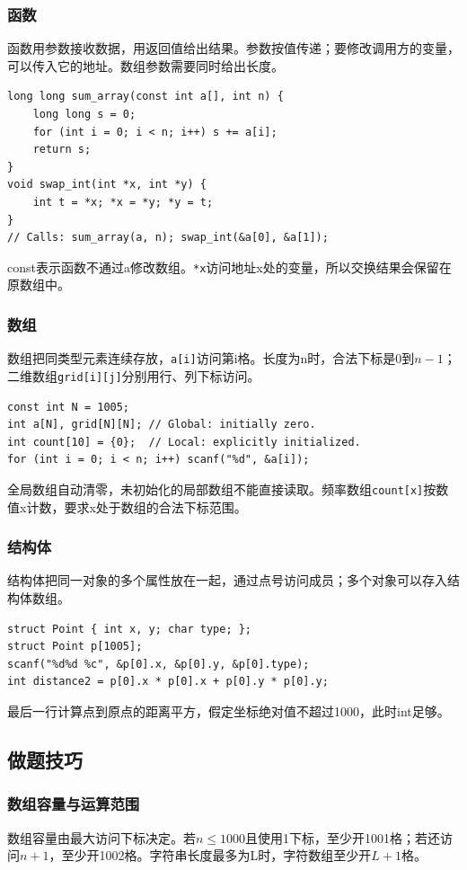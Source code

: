 \subsubsection{函数}
函数用参数接收数据，用返回值给出结果。参数按值传递；要修改调用方的变量，可以传入它的地址。数组参数需要同时给出长度。
\begin{lstlisting}
long long sum_array(const int a[], int n) {
    long long s = 0;
    for (int i = 0; i < n; i++) s += a[i];
    return s;
}
void swap_int(int *x, int *y) {
    int t = *x; *x = *y; *y = t;
}
// Calls: sum_array(a, n); swap_int(&a[0], &a[1]);
\end{lstlisting}
const表示函数不通过a修改数组。\texttt{*x}访问地址x处的变量，所以交换结果会保留在原数组中。
\subsubsection{数组}
数组把同类型元素连续存放，\texttt{a[i]}访问第i格。长度为n时，合法下标是0到$n-1$；二维数组\texttt{grid[i][j]}分别用行、列下标访问。
\begin{lstlisting}
const int N = 1005;
int a[N], grid[N][N]; // Global: initially zero.
int count[10] = {0};  // Local: explicitly initialized.
for (int i = 0; i < n; i++) scanf("%d", &a[i]);
\end{lstlisting}
全局数组自动清零，未初始化的局部数组不能直接读取。频率数组\texttt{count[x]}按数值x计数，要求x处于数组的合法下标范围。
\subsubsection{结构体}
结构体把同一对象的多个属性放在一起，通过点号访问成员；多个对象可以存入结构体数组。
\begin{lstlisting}
struct Point { int x, y; char type; };
struct Point p[1005];
scanf("%d%d %c", &p[0].x, &p[0].y, &p[0].type);
int distance2 = p[0].x * p[0].x + p[0].y * p[0].y;
\end{lstlisting}
最后一行计算点到原点的距离平方，假定坐标绝对值不超过1000，此时int足够。
\subsection{做题技巧}
\subsubsection{数组容量与运算范围}
数组容量由最大访问下标决定。若$n\le1000$且使用1下标，至少开1001格；若还访问$n+1$，至少开1002格。字符串长度最多为L时，字符数组至少开$L+1$格。

